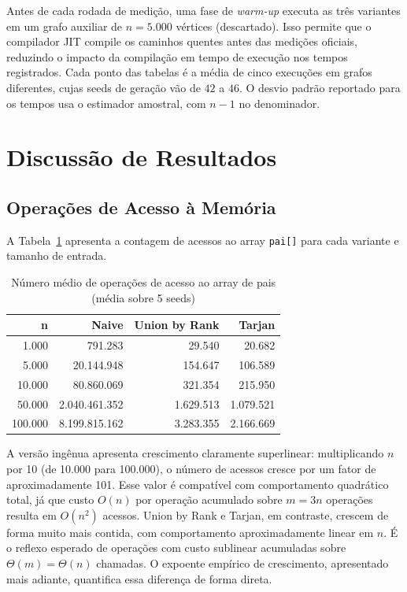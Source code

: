 \documentclass[12pt]{article}
\begin{document}
Antes de cada rodada de medição, uma fase de \textit{warm-up} executa as três variantes em um grafo auxiliar de $n = 5.000$ vértices (descartado). Isso permite que o compilador JIT compile os caminhos quentes antes das medições oficiais, reduzindo o impacto da compilação em tempo de execução nos tempos registrados. Cada ponto das tabelas é a média de cinco execuções em grafos diferentes, cujas seeds de geração vão de $42$ a $46$. O desvio padrão reportado para os tempos usa o estimador amostral, com $n-1$ no denominador.


\section{Discussão de Resultados}
\label{sec:resultados}

\subsection{Operações de Acesso à Memória}

A Tabela~\ref{tab:operacoes} apresenta a contagem de acessos ao array \texttt{pai[]} para cada variante e tamanho de entrada.

\begin{table}[!ht]
\centering
\caption{Número médio de operações de acesso ao array de pais (média sobre 5 seeds)}
\label{tab:operacoes}
\begin{tabular}{|r|r|r|r|}
\hline
\textbf{n} & \textbf{Naive} & \textbf{Union by Rank} & \textbf{Tarjan} \\
\hline
1.000      & 791.283           & 29.540        & 20.682    \\
5.000      & 20.144.948        & 154.647       & 106.589   \\
10.000     & 80.860.069        & 321.354       & 215.950   \\
50.000     & 2.040.461.352     & 1.629.513     & 1.079.521 \\
100.000    & 8.199.815.162     & 3.283.355     & 2.166.669 \\
\hline
\end{tabular}
\end{table}

A versão ingênua apresenta crescimento claramente superlinear: multiplicando $n$ por 10 (de 10.000 para 100.000), o número de acessos cresce por um fator de aproximadamente 101. Esse valor é compatível com comportamento quadrático total, já que custo $O(n)$ por operação acumulado sobre $m = 3n$ operações resulta em $O(n^2)$ acessos. Union by Rank e Tarjan, em contraste, crescem de forma muito mais contida, com comportamento aproximadamente linear em $n$. É o reflexo esperado de operações com custo sublinear acumuladas sobre $\Theta(m) = \Theta(n)$ chamadas. O expoente empírico de crescimento, apresentado mais adiante, quantifica essa diferença de forma direta.
\end{document}
